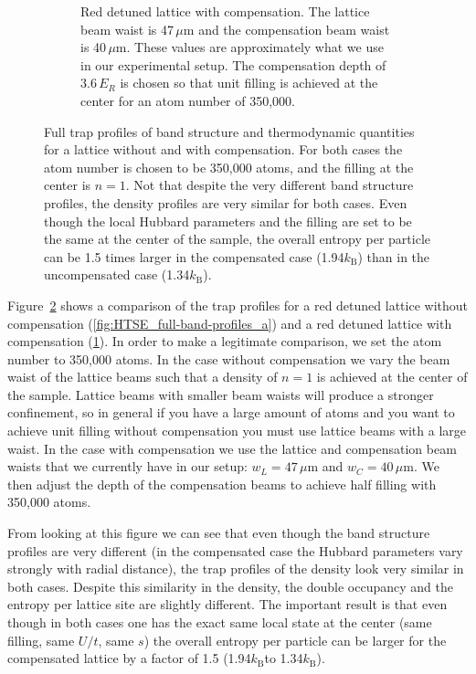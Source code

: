 \documentclass[11pt,letter]{article}
\newcommand{\kb}{\ensuremath{k_{\text{B}}}}
\begin{document}
\begin{figure}
\begin{subfigure}[t]{0.48\textwidth}
\caption{Red detuned lattice with compensation.  The lattice beam waist is
47\,$\mu$m and the compensation beam waist is 40\,$\mu$m.  These values are
approximately what we use in our experimental setup.   The compensation depth
of 3.6\,$E_{R}$ is chosen so that unit filling is achieved at the center for an
atom number of 350,000.}
                \label{fig:HTSE_full-band-profiles_b}
        \end{subfigure}
	\caption{Full trap profiles of band structure and thermodynamic
quantities for a lattice without and with compensation.  For both cases the
atom number is chosen to be 350,000 atoms, and the filling at the center is
$n=1$.   Not that despite the very different band structure profiles, the
density profiles are very similar for both cases.  Even though the local
Hubbard parameters and the filling are set to be the same at the center of the
sample, the overall entropy per particle can be 1.5 times larger in the
compensated case (1.94\kb) than in the uncompensated case (1.34\kb). }
\label{fig:HTSE_full-band-profiles}
\end{figure}
Figure~\ref{fig:HTSE_full-band-profiles} shows a comparison of the trap
profiles for a red detuned lattice without compensation
(\ref{fig:HTSE_full-band-profiles_a}) and a red detuned lattice with
compensation (\ref{fig:HTSE_full-band-profiles_b}).    In order to make a
legitimate comparison, we set the atom number to 350,000 atoms.  In the case
without compensation we vary the beam waist of the lattice beams such that a
density of $n=1$ is achieved at the center of the sample.   Lattice beams with
smaller beam waists will produce a stronger confinement, so in general if you
have a large amount of atoms and you want to achieve unit filling without
compensation you must use lattice beams with a large waist.    In the case with
compensation we use the lattice and compensation beam waists that we currently
have in our setup:  $w_{L}=47\,\mu$m and $w_{C}=40\,\mu$m.   We then adjust the
depth of the compensation beams to achieve half filling with 350,000 atoms.  


From looking at this figure we can see that even though the band structure
profiles are very different (in the compensated case the Hubbard parameters
vary strongly with radial distance),  the trap profiles of the density look
very similar in both cases.  Despite this similarity in the density,  the
double occupancy and the entropy per lattice site are slightly different.   The
important result is that even though in both cases one has the exact same local
state at the center (same filling, same $U/t$, same $s$)  the overall entropy
per particle can be larger for the compensated lattice by a factor of 1.5
(1.94\kb to 1.34\kb).   
\end{document}
